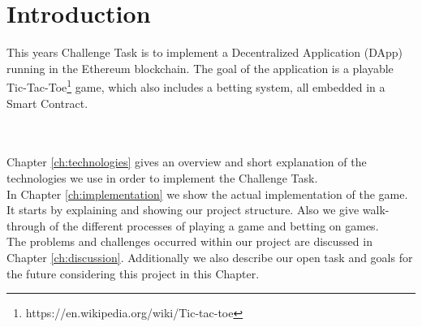 \chapter{Introduction}\label{ch:introduction}
This years Challenge Task is to implement a Decentralized Application (DApp) running in the Ethereum blockchain. The goal of the application is a playable Tic-Tac-Toe\footnote{https://en.wikipedia.org/wiki/Tic-tac-toe} game, which also includes a betting system, all embedded in a Smart Contract.


\\\\
Chapter \ref{ch:technologies} gives an overview and short explanation of the technologies we use in order to implement the Challenge Task.\\
In Chapter \ref{ch:implementation} we show the actual implementation of the game. It starts by explaining and showing our project structure. Also we give walk-through of the different processes of playing a game and betting on games.\\
The problems and challenges occurred within our project are discussed in Chapter \ref{ch:discussion}. Additionally we also describe our open task and goals for the future considering this project in this Chapter.